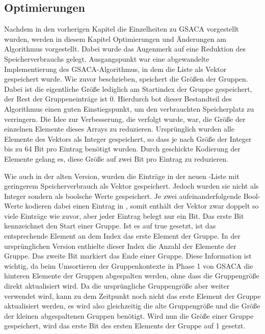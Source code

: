 \newpage
\subsection{Optimierungen}
\label{gsaca:chapter7}
Nachdem in den vorherigen Kapitel die Einzelheiten zu GSACA vorgestellt wurden, werden in diesem Kapitel Optimierungen und Änderungen am Algorithmus vorgestellt.
Dabei wurde das Augenmerk auf eine Reduktion des Speicherverbrauchs gelegt.
Ausgangspunkt war eine abgewandelte Implementierung des GSACA-Algorithmus, in dem die Liste \gsize als Vektor gespeichert wurde.
Wie zuvor beschrieben, speichert \gsize die Größen der Gruppen.
Dabei ist die eigentliche Größe lediglich am Startindex der Gruppe gespeichert, der Rest der Gruppeneinträge ist 0.
Hierdurch bot dieser Bestandteil des Algorithmus einen guten Einstiegspunkt, um den verbrauchten Speicherplatz zu verringern.
Die Idee zur Verbesserung, die verfolgt wurde, war, die Größe der einzelnen Elemente dieses Arrays zu reduzieren.
Ursprünglich wurden alle Elemente des Vektors als Integer gespeichert, so dass je nach Größe der Integer bis zu 64 Bit pro Eintrag benötigt wurden.
Durch geschickte Kodierung der Elemente gelang es, diese Größe auf zwei Bit pro Eintrag zu reduzieren. \par
Wie auch in der alten Version, wurden die Einträge in der neuen \gsize-Liste mit geringerem Speicherverbrauch als Vektor gespeichert.
Jedoch wurden sie nicht als Integer sondern als boolsche Werte gespeichert.
Je zwei aufeinanderfolgende Bool-Werte kodieren dabei einen Eintrag in \gsize, somit enthält der Vektor zwar doppelt so viele Einträge wie zuvor, aber jeder Eintrag belegt nur ein Bit.
Das erste Bit kennzeichnet den Start einer Gruppe.
Ist es auf true gesetzt, ist das entsprechende Element an dem Index das erste Element der Gruppe.
In der ursprünglichen Version enthielte dieser Index die Anzahl der Elemente der Gruppe.
Das zweite Bit markiert das Ende einer Gruppe.
Diese Information ist wichtig, da beim Umsortieren der Gruppenkontexte in Phase 1 von GSACA die hinteren Elemente der Gruppen abgespalten werden, ohne dass die Gruppengröße direkt aktualisiert wird.
Da die ursprüngliche Gruppengröße aber weiter verwendet wird, kann zu dem Zeitpunkt noch nicht das erste Element der Gruppe aktualisiert werden, es wird also gleichzeitig die alte Gruppengröße und die Größe der kleinen abgespaltenen Gruppen benötigt.
Wird nun die Größe einer Gruppe gespeichert, wird das erste Bit des ersten Elements der Gruppe auf 1 gesetzt.
